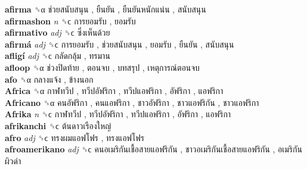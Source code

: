 \textbf{afirma} ␝α   ช่วยสนับสนุน ,  ยืนยัน ,  ยืนยันหนักแน่น ,  สนับสนุน   \\
\textbf{afirmashon} \emph{n}  ␝ϲ   การยอมรับ ,  ยอมรับ   \\
\textbf{afirmativo} \emph{adj}  ␝ϲ   ซึ่งเห็นด้วย   \\
\textbf{afirmá} \emph{adj}  ␝ϲ   การยอมรับ ,  ช่วยสนับสนุน ,  ยอมรับ ,  ยืนยัน ,  สนับสนุน   \\
\textbf{afligí} \emph{adj}  ␝ϲ   กลัดกลุ้ม ,  ทรมาน   \\
\textbf{afloop} ␝α   ช่วงปิดท้าย ,  ตอนจบ ,  บทสรุป ,  เหตุการณ์ตอนจบ   \\
\textbf{afo} ␝α   กลางแจ้ง ,  ข้างนอก   \\
\textbf{Africa} ␝α   กาฬทวีป ,  ทวีปอัฟริกา ,  ทวีปแอฟริกา ,  อัฟริกา ,  แอฟริกา   \\
\textbf{Africano} ␝α   คนอัฟริกา ,  คนแอฟริกา ,  ชาวอัฟริกา ,  ชาวแอฟริกัน ,  ชาวแอฟริกา   \\
\textbf{Afrika} \emph{n}  ␝ϲ   กาฬทวีป ,  ทวีปอัฟริกา ,  ทวีปแอฟริกา ,  อัฟริกา ,  แอฟริกา   \\
\textbf{afrikanchi} ␝ϲ   ต้นดาวเรืองใหญ่   \\
\textbf{afro} \emph{adj}  ␝ϲ   ทรงผมแอฟโฟร ,  ทรงแอฟโฟร   \\
\textbf{afroamerikano} \emph{adj}  ␝ϲ   คนอเมริกันเชื้อสายแอฟริกัน ,  ชาวอเมริกันเชื้อสายแอฟริกัน ,  อเมริกันผิวดำ   \\
